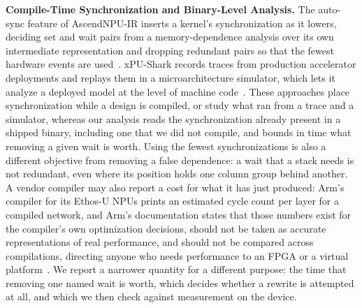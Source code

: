 \textbf{Compile-Time Synchronization and Binary-Level Analysis.}
The auto-sync feature of AscendNPU-IR inserts a kernel's synchronization as it lowers, deciding set and wait pairs from a memory-dependence analysis over its own intermediate representation and dropping redundant pairs so that the fewest hardware events are used~\citep{ascend-autosync}.
xPU-Shark records traces from production accelerator deployments and replays them in a microarchitecture simulator, which lets it analyze a deployed model at the level of machine code~\citep{zarkadas2025xpushark}.
These approaches place synchronization while a design is compiled, or study what ran from a trace and a simulator, whereas our analysis reads the synchronization already present in a shipped binary, including one that we did not compile, and bounds in time what removing a given wait is worth.
Using the fewest synchronizations is also a different objective from removing a false dependence: a wait that a stack needs is not redundant, even where its position holds one column group behind another.
A vendor compiler may also report a cost for what it has just produced: Arm's compiler for its Ethos-U NPUs prints an estimated cycle count per layer for a compiled network, and Arm's documentation states that those numbers exist for the compiler's own optimization decisions, should not be taken as accurate representations of real performance, and should not be compared across compilations, directing anyone who needs performance to an FPGA or a virtual platform~\citep{vela-performance}.
We report a narrower quantity for a different purpose: the time that removing one named wait is worth, which decides whether a rewrite is attempted at all, and which we then check against measurement on the device.

